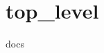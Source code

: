\chapter{top\+\_\+level}
\hypertarget{md_dirac__solver_8egg-info_2top__level}{}\label{md_dirac__solver_8egg-info_2top__level}
 docs 